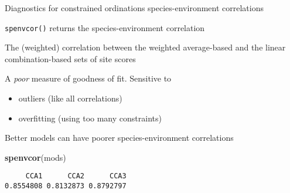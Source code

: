 \documentclass[10pt,ignorenonframetext,compress, aspectratio=169]{beamer}
\newenvironment{Shaded}{\begin{snugshade}}{\end{snugshade}}
\newcommand{\KeywordTok}[1]{\textcolor[rgb]{0.13,0.29,0.53}{\textbf{{#1}}}}
\newcommand{\NormalTok}[1]{{#1}}
\begin{document}
\begin{frame}[fragile]{Diagnostics for constrained ordinations
\textbar{} species-environment correlations}

\texttt{spenvcor()} returns the species-environment correlation

The (weighted) correlation between the weighted average-based and the
linear combination-based sets of site scores

A \emph{poor} measure of goodness of fit. Sensitive to

\begin{itemize}
\itemsep1pt\parskip0pt
\item
  outliers (like all correlations)
\item
  overfitting (using too many constraints)
\end{itemize}

Better models can have poorer species-environment correlations

\scriptsize

\begin{Shaded}
\begin{Highlighting}[]
\KeywordTok{spenvcor}\NormalTok{(mods)}
\end{Highlighting}
\end{Shaded}

\begin{verbatim}
     CCA1      CCA2      CCA3 
0.8554808 0.8132873 0.8792797 
\end{verbatim}

\normalsize

\end{frame}
\end{document}
